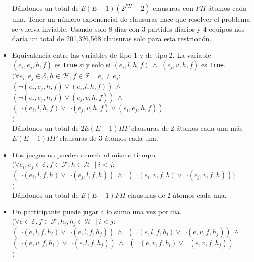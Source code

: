 \documentclass[a4paper,10pt]{article}
\newcommand{\tab}{\hspace*{0.5cm}}
\begin{document}
\begin{itemize}
      D\'andonos un total de $E(E-1)(2^{FH} - 2)$ clausuras con $FH$ 
      \'atomos cada una. Tener un n\'umero exponencial de clausuras hace que resolver 
      el problema se vuelva inviable. Usando solo 8 d\'ias con 3 partidos diarios
      y 4 equipos nos dar\'ia un total de 201,326,568 clausuras solo para esta 
      restricci\'on.\\
      
      \item Equivalencia entre las variables de tipo 1 y de tipo 2. La variable 
      $(e_i, e_j, h, f)$ es \verb|True| si y solo si $(e_i, l, h, f) \: \wedge $
      $(e_j, v, h, f)$ es \verb|True|. \\

      $(\forall e_i, e_j \in \mathcal{E}, h \in \mathcal{H}, f \in \mathcal{F} \: |$
      $ \: e_i \neq e_j :$\\
      \tab $(\neg (e_i, e_j, h, f) \vee (e_i, l, h, f)) \: \wedge$\\
      \tab $(\neg (e_i, e_j, h, f) \vee (e_j, v, h, f)) \: \wedge$\\
      \tab $(\neg (e_i, l, h, f) \vee \neg (e_j, v, h, f) \vee (e_i, e_j, h, f))$\\
      $)$\\

      D\'andonos un total de $2E(E-1)HF$ clausuras de 2 \'atomos cada una 
      m\'as $E(E-1)HF$ clausuras de 3 \'atomos cada una.
      


      \item Dos juegos no pueden ocurrir al mismo tiempo.\\
      
      $(\forall e_i, e_j \in \mathcal{E}, f \in \mathcal{F}, h \in \mathcal{H} \: $
      $| \: i < j: $\\
      \tab $(\neg (e_i, l, f, h) \vee \neg (e_j, l ,f, h)) \: \wedge \: $
      $(\neg (e_i, v, f, h) \vee \neg (e_j, v ,f, h)))$\\
      $)$\\

      D\'andonos un total de $E(E-1)FH$ clausuras de 2 \'atomos cada una.\\ 

      \item Un participante puede jugar a lo sumo una vez por día.\\
      
      $(\forall e \in \mathcal{E}, f \in \mathcal{F}, h_i, h_j \in \mathcal{H} $
      $\: | \: i < j : $\\
      \tab $(\neg (e, l, f, h_i) \vee \neg (e, l, f, h_j)) \: \wedge \: $
      $(\neg (e, l, f, h_i) \vee \neg (e, v, f, h_j)) \: \wedge \: $ \\
      \tab $(\neg (e, v, f, h_i) \vee \neg (e, l, f, h_j)) \: \wedge \: $
      $(\neg (e, v, f, h_i) \vee \neg (e, v, f, h_j))$ \\
      $)$\\


\end{itemize}
\end{document}
